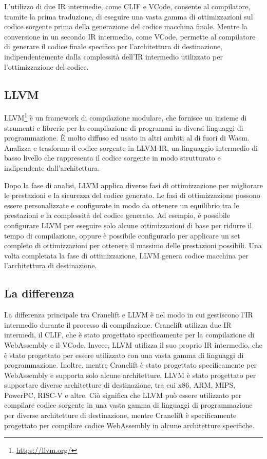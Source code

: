 L'utilizzo di due IR intermedie, come CLIF e VCode, consente al compilatore, tramite la prima traduzione, di eseguire
una vasta gamma di ottimizzazioni sul codice sorgente prima della generazione del codice macchina finale. Mentre la
conversione in un secondo IR intermedio, come VCode, permette al compilatore di generare il codice finale specifico per
l'architettura di destinazione, indipendentemente dalla complessità dell'IR intermedio utilizzato per l'ottimizzazione
del codice. 

\subsection{LLVM}
LLVM\footnote{\url{https://llvm.org/}} è un framework di compilazione modulare, che fornisce un insieme di strumenti e
librerie per la compilazione di programmi in diversi linguaggi di programmazione. È molto diffuso ed usato in altri
ambiti al di fuori di Wasm. Analizza e trasforma il codice sorgente in LLVM IR, un linguaggio intermedio di basso
livello che rappresenta il codice sorgente in modo strutturato e indipendente dall'architettura.

Dopo la fase di analisi, LLVM applica diverse fasi di ottimizzazione per migliorare le prestazioni e la sicurezza del
codice generato. Le fasi di ottimizzazione possono essere personalizzate e configurate in modo da ottenere un equilibrio
tra le prestazioni e la complessità del codice generato. Ad esempio, è possibile configurare LLVM per eseguire solo
alcune ottimizzazioni di base per ridurre il tempo di compilazione, oppure è possibile configurarlo per applicare un set
completo di ottimizzazioni per ottenere il massimo delle prestazioni possibili. Una volta completata la fase di
ottimizzazione, LLVM genera codice macchina per l'architettura di destinazione.

\subsection{La differenza}
La differenza principale tra Cranelift e LLVM è nel modo in cui gestiscono l'IR intermedio durante il processo di
compilazione. Cranelift utilizza due IR intermedi, il CLIF, che è stato progettato specificamente per la compilazione di
WebAssembly e il VCode. Invece, LLVM utilizza il suo proprio IR intermedio, che è stato progettato per essere utilizzato
con una vasta gamma di linguaggi di programmazione. Inoltre, mentre Cranelift è stato progettato specificamente per
WebAssembly e supporta solo alcune architetture, LLVM è stato progettato per supportare diverse architetture di
destinazione, tra cui x86, ARM, MIPS, PowerPC, RISC-V e altre. Ciò significa che LLVM può essere utilizzato per
compilare codice sorgente in una vasta gamma di linguaggi di programmazione per diverse architetture di destinazione,
mentre Cranelift è specificamente progettato per compilare codice WebAssembly in alcune architetture specifiche.

